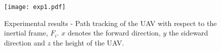 \documentclass[a4paper, 10pt, conference]{ieeeconf}
\begin{document}
%
%
%
%
%
%
%
%
\begin{figure}[t]
  \centering
   \texttt{[image: exp1.pdf]}
  \caption{Experimental results - Path tracking of the UAV with respect to the inertial
    frame, $F_i$. $x$ denotes the forward direction, $y$ the sideward
    direction and $z$ the height of the UAV.}
  \label{fig:real_UAV}
\end{figure}
\end{document}
